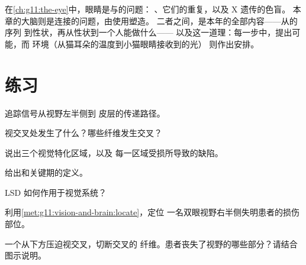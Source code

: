 \begin{remark}[本年的收获]\label{rem:g11:vision-and-brain:year}
在\cref{ch:g11:the-eye}中，眼睛是与的问题：
、它们的重复，以及 X 遗传的色盲。
本章的大脑则是连接的问题，由使用塑造。
二者之间，是本年的全部内容——从的序列
到性状，再从性状到一个人能做什么——
以及这一道理：每一步中，提出可能，而
环境（从猫耳朵的温度到小猫眼睛接收到的光）
则作出安排。
\end{remark}

\section{练习}

\begin{exercise}[$\star$]\label{exo:g11:vision-and-brain:1}
追踪信号从视野左半侧到
皮层的传递路径。
\end{exercise}

\begin{exercise}[$\star$]\label{exo:g11:vision-and-brain:2}
视交叉处发生了什么？哪些纤维发生交叉？
\end{exercise}

\begin{exercise}[$\star$]\label{exo:g11:vision-and-brain:3}
说出三个视觉特化区域，以及
每一区域受损所导致的缺陷。
\end{exercise}

\begin{exercise}[$\star$]\label{exo:g11:vision-and-brain:4}
给出和关键期的定义。
\end{exercise}

\begin{exercise}[$\star$]\label{exo:g11:vision-and-brain:5}
LSD 如何作用于视觉系统？
\end{exercise}

\begin{exercise}[$\star\star$]\label{exo:g11:vision-and-brain:6}
利用\cref{met:g11:vision-and-brain:locate}，定位
一名双眼视野右半侧失明患者的损伤部位。
\end{exercise}

\begin{exercise}[$\star\star$]\label{exo:g11:vision-and-brain:7}
一个从下方压迫视交叉，切断交叉的
纤维。患者丧失了视野的哪些部分？请结合
图示说明。
\end{exercise}

